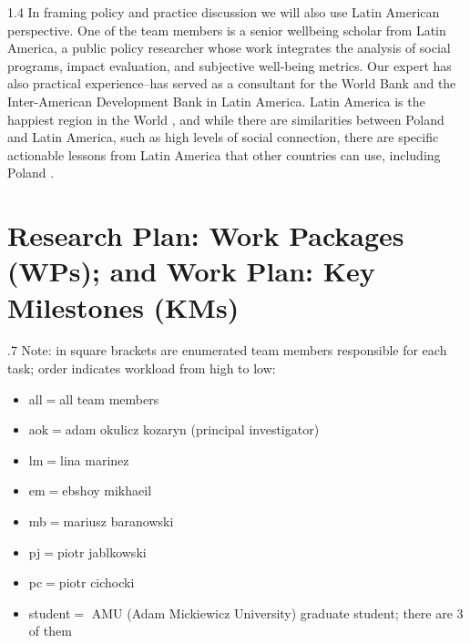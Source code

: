 \documentclass[10pt, letterpaper]{article}
\begin{document}
\begin{spacing}{1.4}
 In framing policy and practice discussion we will also use Latin American
 perspective. One of the team members is a senior wellbeing scholar from
 Latin America, a public policy researcher whose work integrates the analysis of
 social programs, impact evaluation, and subjective well-being metrics. Our
 expert has also practical experience--has served as a consultant for the World Bank and the Inter-American
  Development Bank in Latin America. Latin America is the happiest region in the
  World \citep{rojas15,rojas25}, and while there are similarities
  between Poland and Latin America, such as high levels of social connection,
  there are 
 specific actionable lessons from Latin America that  other countries can use,
 including Poland \citep{colQolSwb25}. 
  
  
\section{Research Plan: Work Packages (WPs); and Work Plan: Key Milestones (KMs)} 

\begin{spacing}{.7}
Note: in square brackets are enumerated team members responsible for each task;
order indicates workload from high to low: 
\begin{itemize}
\item all$=$all team members
\item aok$=$adam okulicz kozaryn (principal investigator) 
\item lm$=$lina marinez
\item em$=$ebshoy mikhaeil
\item mb$=$mariusz baranowski
\item pj$=$piotr jablkowski
\item pc$=$piotr cichocki
\item student$=$ AMU (Adam Mickiewicz University) graduate student; there are 3 of them
\end{itemize}


\end{spacing}
\end{spacing}
\end{document}
